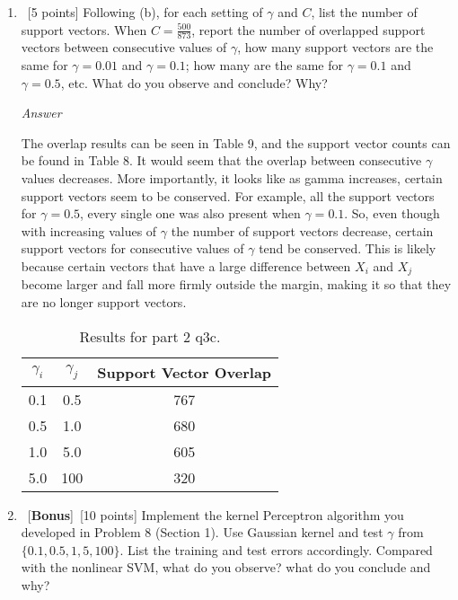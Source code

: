 \documentclass[12pt, fullpage,letterpaper]{article}
\begin{document}
\begin{enumerate}
\begin{enumerate}
	\item~[5 points] Following (b), for each setting of $\gamma$ and $C$, list the number of support vectors. When $C = \frac{500}{873}$, report the number of overlapped support vectors between consecutive values of $\gamma$, \ie how many support vectors are the same for $\gamma= 0.01$ and $\gamma = 0.1$; how many are the same for  $\gamma = 0.1$ and $\gamma = 0.5$, etc. What do you observe and conclude? Why?
	
	\emph{Answer}
	
	The overlap results can be seen in Table 9, and the support vector counts can be found in Table 8. It would seem that the overlap between consecutive $\gamma$ values decreases. More importantly, it looks like as gamma increases, certain support vectors seem to be conserved. For example, all the support vectors for $\gamma=0.5$, every single one was also present when $\gamma=0.1$. So, even though with increasing values of $\gamma$ the number of support vectors decrease, certain support vectors for consecutive values of $\gamma$ tend be conserved. This is likely because certain vectors that have a large difference between $X_i$ and $X_j$ become larger and fall more firmly outside the margin, making it so that they are no longer support vectors.
	
	\begin{table}[h]
		\centering
		\begin{tabular}{cc|c}
			$\gamma_i$ & $\gamma_j$ & Support Vector Overlap \\
			\hline\hline
            0.1 & 0.5 & 767 \\ \hline
            0.5 & 1.0 & 680 \\ \hline
            1.0 & 5.0 & 605 \\ \hline
            5.0 & 100 & 320 \\ \hline
		\end{tabular}
	\caption{Results for part 2 q3c.}
	\end{table}
	
	\item~[\textbf{Bonus}]~[10 points] Implement the kernel Perceptron algorithm you developed in Problem 8 (Section 1). Use Gaussian kernel and test $\gamma$ from $\{ 0.1, 0.5, 1, 5, 100\}$. List the training and test errors accordingly. Compared with the nonlinear SVM, what do you observe? what do you conclude and why?
	
\end{enumerate} 

\end{enumerate}
\end{document}
